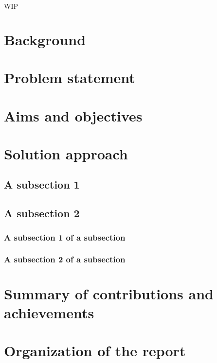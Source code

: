 WIP
\section{Background}
\label{sec:into_back}

\section{Problem statement}
\label{sec:intro_prob_art}

\section{Aims and objectives}
\label{sec:intro_aims_obj}

\section{Solution approach}
\label{sec:intro_sol} %


\subsection{A subsection 1}
\label{sec:intro_some_sub1}


\subsection{A subsection 2}
\label{sec:intro_some_sub2}

\subsubsection{A subsection 1 of a subsection}
\label{sec:intro_some_subsub1}

\subsubsection{A subsection 2 of a subsection}
\label{sec:intro_some_subsub2}

\section{Summary of contributions and achievements} %
\label{sec:intro_sum_results} %


\section{Organization of the report} %
\label{sec:intro_org} %


